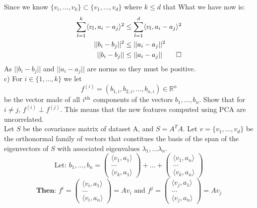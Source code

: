 \documentclass[12pt,twoside]{article}
\newcommand{\R}{\mathbb{R}}
\begin{document}
Since we know $\{v_i,\dots,v_k\} \subset \{v_1,\dots,v_d\}$ where $k\leq d$ that What we have now is:
\begin{equation}
    \begin{split}
     \sum_{l=1}^k \langle v_l, a_i-a_j\rangle^2 &\leq \sum_{l=1}^d \langle v_l, a_i-a_j \rangle^2\\
        ||b_i - b_j || ^2 &\leq ||a_i - a_j||^2 \\
        ||b_i - b_j || &\leq ||a_i - a_j|| \qed
    \end{split}
\end{equation}
As $||b_i - b_j ||$ and $||a_i - a_j||$ are norms so they must be positive.\\
	
c) For $i \in \{1, \dots, k\}$ we let
$$
f^{(i)} = (b_{1,i}, b_{2,i}, \dots, b_{n,i}) \in \R^n
$$
be the vector made of all $i^{\rm th}$ components of the vectors $b_1, \dots, b_n$.
Show that for $i \neq j$, $f^{(i)} \perp f^{(j)}$. This means that the new features computed using PCA are uncorrelated. \\

Let $S$ be the covariance matrix of dataset A, and $S=A^TA$. Let $v=\{v_1,\dots,v_d\}$ be the orthonormal family of vectors that constitues the basis of the span of the eigenvectors of $S$ with associated eigenvalues $\lambda_1, \dots \lambda_n$. 
$$
    \text{Let: } b_1, \dots, b_n = \begin{pmatrix} \langle v_1,a_1 \rangle \\ \dots \\ \langle v_k, a_1\rangle \end{pmatrix} + \dots + \begin{pmatrix} \langle v_1,a_n \rangle \\ \dots \\ \langle v_k, a_n\rangle \end{pmatrix}
$$
$$
    \textbf{Then: } f^{i} = \begin{pmatrix} \langle v_i,a_1 \rangle \\ \dots \\ \langle v_i, a_n\rangle \end{pmatrix} = Av_i \text{ and } f^{j} = \begin{pmatrix} \langle v_j,a_1 \rangle \\ \dots \\ \langle v_j, a_n\rangle \end{pmatrix} = Av_j
$$
\end{document}

